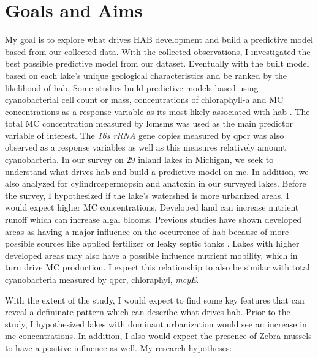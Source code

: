 \clearpage

 \section{Goals and Aims}
My goal is to explore what drives HAB development and build a predictive model based from our collected data.  With the collected observations, I investigated the best possible predictive model from our dataset. Eventually with the built model based on each lake's unique geological characteristics and be ranked by the likelihood of \gls{hab}.
Some studies build predictive models based using cyanobacterial cell count or mass, concentrations of chloraphyll-a and MC concentrations as a response variable as its most likely associated with \gls{hab} \cite{moore_richard_cyanobacterial_1993, ahn_evaluation_2011, jiang_statistical_2008, beaulieu_nutrients_2013, taranu_predicting_2017}.
The total MC concentration measured by \gls{lcmsms} was used as the main predictor variable of interest. The \emph{16s rRNA} gene copies measured by \gls{qpcr} was also observed as a response variables as well as this measures relatively amount cyanobacteria. In our survey on 29 inland lakes in Michigan, we seek to understand what drives \gls{hab} and build a predictive model on \gls{mc}. In addition, we also analyzed for cylindrospermopsin and anatoxin in our surveyed lakes. Before the survey, I hypothesized if the lake's watershed is more urbanized areas, I would expect higher MC concentrations. Developed land can increase nutrient runoff which can increase algal blooms. Previous studies have shown developed areas as having a major influence on the occurrence of \gls{hab} because of more possible sources like applied fertilizer or leaky septic tanks \cite{beaver_land_2014, anderson_harmful_2002}. Lakes with higher developed areas may also have a possible influence nutrient mobility, which in turn drive MC production. I expect this relationship to also be similar with total cyanobacteria measured by \gls{qpcr}, chloraphyl, \emph{mcyE}. %

With the extent of the study, I would expect to find some key features that can reveal a defininate pattern which can describe what drives \gls{hab}. Prior to the study, I hypothesized lakes with dominant urbanization would see an increase in \gls{mc} concentrations. In addition, I also would expect the presence of Zebra mussels to have a positive influence as well. My research hypotheses:

